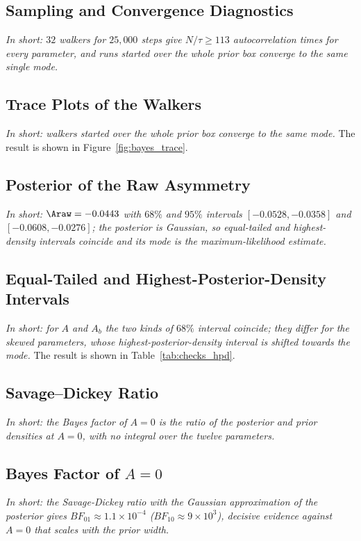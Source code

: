 \subsection{Sampling and Convergence Diagnostics}
\emph{In short: $32$ walkers for $25{,}000$ steps give $N/\tau\geq113$ autocorrelation times for every parameter, and runs started over the whole prior box converge to the same single mode.}

\subsection{Trace Plots of the Walkers}
\label{sec:appendix}
\emph{In short: walkers started over the whole prior box converge to the same mode.}
The result is shown in Figure~\ref{fig:bayes_trace}.


\subsection{Posterior of the Raw Asymmetry}
\emph{In short: $\Araw=-0.0443$ with $68\%$ and $95\%$ intervals $[-0.0528,-0.0358]$ and $[-0.0608,-0.0276]$; the posterior is Gaussian, so equal-tailed and highest-density intervals coincide and its mode is the maximum-likelihood estimate.}

\subsection{Equal-Tailed and Highest-Posterior-Density Intervals}
\label{sec:checks_hpd}
\emph{In short: for $A$ and $A_b$ the two kinds of $68\%$ interval coincide; they differ for the skewed parameters, whose highest-posterior-density interval is shifted towards the mode.}
The result is shown in Table~\ref{tab:checks_hpd}.


\subsection{Savage--Dickey Ratio}
\label{sec:appendix_sd}
\emph{In short: the Bayes factor of $A=0$ is the ratio of the posterior and prior densities at $A=0$, with no integral over the twelve parameters.}

\subsection{Bayes Factor of $A=0$}
\emph{In short: the Savage-Dickey ratio with the Gaussian approximation of the posterior gives $BF_{01}\approx1.1\times10^{-4}$ ($BF_{10}\approx9\times10^3$), decisive evidence against $A=0$ that scales with the prior width.}

